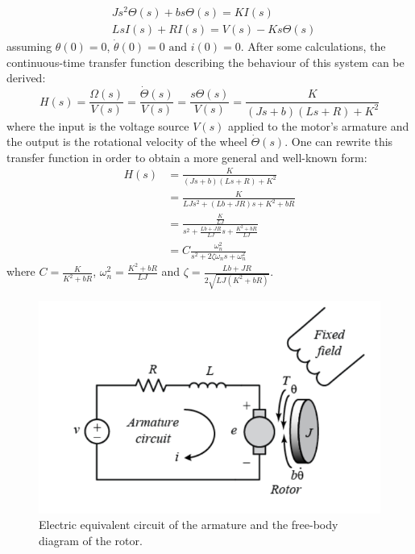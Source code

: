 \documentclass[a4paper,kul]{kulakarticle} %
\begin{document}
\begin{equation}
\begin{split}
	&Js^2\Theta(s) + bs\Theta(s) = KI(s) \\
	&LsI(s) + RI(s) = V(s) - Ks\Theta(s)	
\end{split}
\end{equation}
assuming $\theta(0) = 0$, $\dot{\theta}(0) = 0 \text{ and } i(0) = 0$. After some calculations, the continuous-time transfer function describing the behaviour of this system can be derived:
\begin{equation}
	\label{eq:TF}
    H(s) = \frac{\Omega(s)}{V(s)} = \frac{\dot{\Theta}(s)}{V(s)} = \frac{s\Theta(s)}{V(s)} = \frac{K}{(Js + b)(Ls + R) + K^2}
\end{equation}
where the input is the voltage source $V(s)$ applied to the motor's armature and the output is the rotational velocity of the wheel  $\dot{\Theta}(s)$. One can rewrite this transfer function in order to obtain a more general and well-known form:
\begin{equation}
\label{eq:TF2}
\begin{split}
	H(s) &= \frac{K}{(Js + b)(Ls + R) + K^2} \\
	 &= \frac{K}{LJs^2 + (Lb + JR)s + K^2 + bR} \\
	 &= \frac{\frac{K}{LJ}}{s^2 + \frac{Lb + JR}{LJ}s + \frac{K^2 + bR}{LJ}} \\
	 &= C \frac{\omega_n^2}{s^2 + 2\zeta\omega_ns + \omega_n^2}
\end{split}
\end{equation}
where $C = \frac{K}{K^2 + bR}$, $\omega_n^2 = \frac{K^2 + bR}{LJ}$ and $\zeta = \frac{Lb+JR}{2\sqrt{LJ(K^2 + bR)}}$.


\begin{figure}[htp!]
    \centering
    \includegraphics[width=.6\linewidth]{DC_motors.png}
    \caption[Electric circuit]{Electric equivalent circuit of the armature and the free-body diagram of the rotor.}
    \label{fig:DCmotors}
\end{figure}
\end{document}
